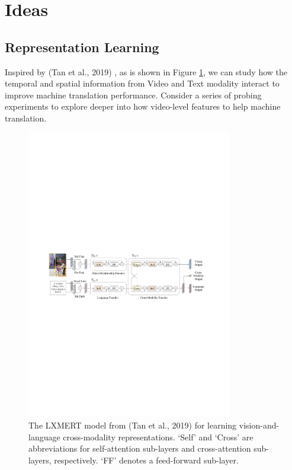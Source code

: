 \documentclass{article}
\begin{document}
\section{Ideas}

\subsection{Representation Learning}

Inspired by (Tan et al., 2019) \cite{tan2019lxmert}, as is shown in Figure \ref{Fig.main3}, we can study how the temporal and spatial information from Video and Text modality interact to improve machine translation performance. Consider a series of probing experiments to explore deeper into how video-level features to help machine translation.


	\begin{figure}[htbp] 
		\centering
		\includegraphics[width=0.8\textwidth]{LXMERT.pdf} 
		\caption{The LXMERT model from (Tan et al., 2019) \cite{tan2019lxmert} for learning vision-and-language cross-modality representations. ‘Self’ and ‘Cross’ are abbreviations for self-attention sub-layers and cross-attention sub-layers, respectively. ‘FF’ denotes a feed-forward sub-layer.}
		\label{Fig.main3} 
	\end{figure}
\end{document}
